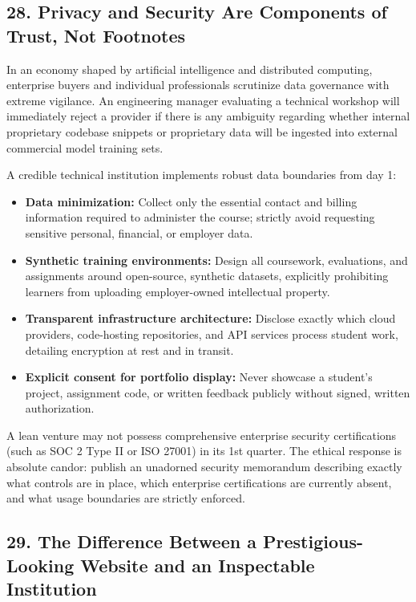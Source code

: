 \subsection*{28. Privacy and Security Are Components of Trust, Not Footnotes}

In an economy shaped by artificial intelligence and distributed computing, enterprise buyers and individual professionals scrutinize data governance with extreme vigilance. An engineering manager evaluating a technical workshop will immediately reject a provider if there is any ambiguity regarding whether internal proprietary codebase snippets or proprietary data will be ingested into external commercial model training sets.

A credible technical institution implements robust data boundaries from day 1:
\begin{itemize}
\item \textbf{Data minimization:} Collect only the essential contact and billing information required to administer the course; strictly avoid requesting sensitive personal, financial, or employer data.
\item \textbf{Synthetic training environments:} Design all coursework, evaluations, and assignments around open-source, synthetic datasets, explicitly prohibiting learners from uploading employer-owned intellectual property.
\item \textbf{Transparent infrastructure architecture:} Disclose exactly which cloud providers, code-hosting repositories, and API services process student work, detailing encryption at rest and in transit.
\item \textbf{Explicit consent for portfolio display:} Never showcase a student's project, assignment code, or written feedback publicly without signed, written authorization.
\end{itemize}

A lean venture may not possess comprehensive enterprise security certifications (such as SOC 2 Type II or ISO 27001) in its 1st quarter. The ethical response is absolute candor: publish an unadorned security memorandum describing exactly what controls are in place, which enterprise certifications are currently absent, and what usage boundaries are strictly enforced.

\subsection*{29. The Difference Between a Prestigious-Looking Website and an Inspectable Institution}

